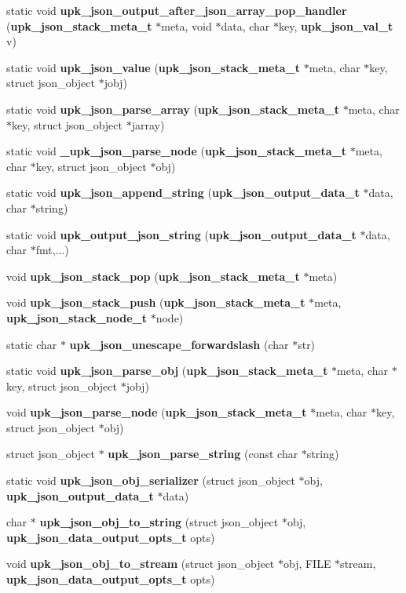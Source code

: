 \begin{DoxyCompactItemize}
\item 
static void {\bf upk\_\-json\_\-output\_\-after\_\-json\_\-array\_\-pop\_\-handler} ({\bf upk\_\-json\_\-stack\_\-meta\_\-t} $\ast$meta, void $\ast$data, char $\ast$key, {\bf upk\_\-json\_\-val\_\-t} v)
\item 
static void {\bf upk\_\-json\_\-value} ({\bf upk\_\-json\_\-stack\_\-meta\_\-t} $\ast$meta, char $\ast$key, struct json\_\-object $\ast$jobj)
\item 
static void {\bf upk\_\-json\_\-parse\_\-array} ({\bf upk\_\-json\_\-stack\_\-meta\_\-t} $\ast$meta, char $\ast$key, struct json\_\-object $\ast$jarray)
\item 
static void {\bf \_\-upk\_\-json\_\-parse\_\-node} ({\bf upk\_\-json\_\-stack\_\-meta\_\-t} $\ast$meta, char $\ast$key, struct json\_\-object $\ast$obj)
\item 
static void {\bf upk\_\-json\_\-append\_\-string} ({\bf upk\_\-json\_\-output\_\-data\_\-t} $\ast$data, char $\ast$string)
\item 
static void {\bf upk\_\-output\_\-json\_\-string} ({\bf upk\_\-json\_\-output\_\-data\_\-t} $\ast$data, char $\ast$fmt,...)
\item 
void {\bf upk\_\-json\_\-stack\_\-pop} ({\bf upk\_\-json\_\-stack\_\-meta\_\-t} $\ast$meta)
\item 
void {\bf upk\_\-json\_\-stack\_\-push} ({\bf upk\_\-json\_\-stack\_\-meta\_\-t} $\ast$meta, {\bf upk\_\-json\_\-stack\_\-node\_\-t} $\ast$node)
\item 
static char $\ast$ {\bf upk\_\-json\_\-unescape\_\-forwardslash} (char $\ast$str)
\item 
static void {\bf upk\_\-json\_\-parse\_\-obj} ({\bf upk\_\-json\_\-stack\_\-meta\_\-t} $\ast$meta, char $\ast$key, struct json\_\-object $\ast$jobj)
\item 
void {\bf upk\_\-json\_\-parse\_\-node} ({\bf upk\_\-json\_\-stack\_\-meta\_\-t} $\ast$meta, char $\ast$key, struct json\_\-object $\ast$obj)
\item 
struct json\_\-object $\ast$ {\bf upk\_\-json\_\-parse\_\-string} (const char $\ast$string)
\item 
static void {\bf upk\_\-json\_\-obj\_\-serializer} (struct json\_\-object $\ast$obj, {\bf upk\_\-json\_\-output\_\-data\_\-t} $\ast$data)
\item 
char $\ast$ {\bf upk\_\-json\_\-obj\_\-to\_\-string} (struct json\_\-object $\ast$obj, {\bf upk\_\-json\_\-data\_\-output\_\-opts\_\-t} opts)
\item 
void {\bf upk\_\-json\_\-obj\_\-to\_\-stream} (struct json\_\-object $\ast$obj, FILE $\ast$stream, {\bf upk\_\-json\_\-data\_\-output\_\-opts\_\-t} opts)
\end{DoxyCompactItemize}



